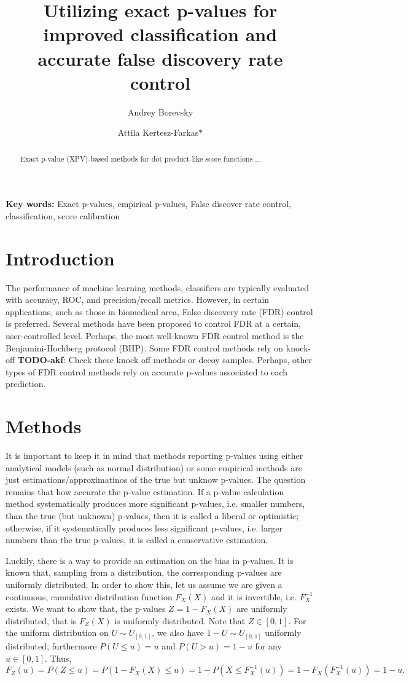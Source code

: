 \documentclass{article}
\author{Andrey Borevsky}
\author{Attila Kertesz-Farkas$\ast$}
\affil{Laboratory on AI for Computational Biology, Faculty of Computer Science, HSE University,  11 Pokrovsky Bvld., Moscow 109028, Russian Federation}
\title{Utilizing exact p-values for improved classification and accurate false discovery rate control}
\newcommand{\todo}[2]{{\color{red} {\bf TODO-#1}: #2}}
\begin{document}
\maketitle

\begin{abstract}
Exact p-value (XPV)-based methods for dot product-like score functions ...


\end{abstract}
\textbf{Key words:} Exact p-values, empirical p-values, False discover rate control, classification, score calibration
\section{Introduction}
The performance of machine learning methods, classifiers are typically evaluated with accuracy, ROC, and precision/recall metrics. However, in certain applications, such as those in biomedical area, False discovery rate (FDR) control is preferred. Several methods have been proposed to control FDR at a certain, user-controlled level. Perhaps, the most well-known FDR control method is the Benjamini-Hochberg protocol (BHP). Some FDR control methods rely on knock-off \todo{akf}{Check these knock off methods} or decoy samples. Perhaps, other types of FDR control methods rely on accurate p-values associated to each prediction.

\section{Methods}

It is important to keep it in mind that methods reporting p-values using either analytical models (such as normal distribution) or some empirical methods are just estimations/approximatinos of the true but unknow p-values. The question remains that how accurate the p-value estimation. If a p-value calculation method systematically produces more significant p-values, i.e. smaller numbers, than the true (but unknown) p-values, then it is called a liberal or optimistic; otherwise, if it systematically produces less significant p-values, i.e. larger numbers than the true p-values, it is called a conservative estimation. 

Luckily, there is a way to provide an estimation on the bias in p-values. It is known that, sampling from a distribution, the corresponding p-values are uniformly distributed. In order to show this, let us assume we are given a continuous, cumulative distribution function $F_X(X)$ and it is invertible, i.e. $F_X^{-1}$ exists. We want to show that, the p-values $Z = 1-F_X(X)$ are uniformly distributed, that is $F_Z(X)$ is uniformly distributed. Note that $Z\in [0,1]$. For the uniform distribution on $U\sim U_{[0,1]}$, we also have $1-U\sim U_{[0,1]}$ uniformly distributed, furthermore $P(U\le u)=u$ and $P(U>u) = 1-u$ for any $u\in[0,1]$. Thus,
\begin{equation}
	F_Z(u)=P(Z \le u) = P(1-F_X(X)\le u)= 1-P(X\le F_X^{-1}(u))=1-F_X(F_X^{-1}(u))=1-u.
\end{equation}
\end{document}
